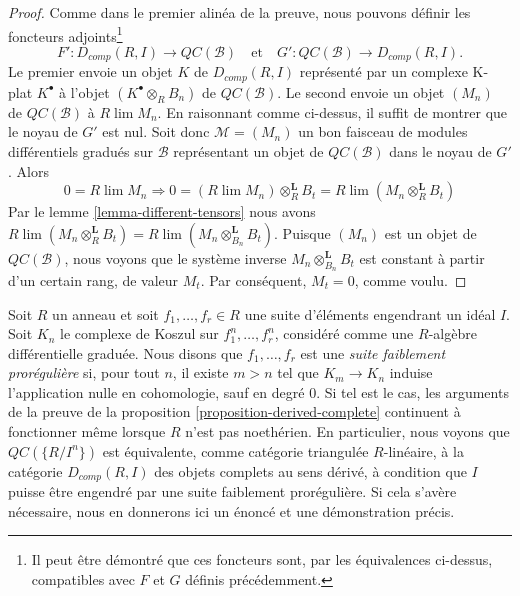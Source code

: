 \begin{proof}
\medskip\noindent
Comme dans le premier alinéa de la preuve, nous pouvons définir les foncteurs adjoints\footnote{Il peut être démontré que ces foncteurs sont, par les équivalences ci-dessus, compatibles avec $F$ et $G$ définis précédemment.}
$$
F' : D_{comp}(R, I) \longrightarrow \mathit{QC}(\mathcal{B})
\quad\text{et}\quad
G' : \mathit{QC}(\mathcal{B}) \longrightarrow D_{comp}(R, I).
$$
Le premier envoie un objet $K$ de $D_{comp}(R, I)$ représenté par un complexe K-plat $K^\bullet$ à l'objet $(K^\bullet \otimes_R B_n)$ de $\mathit{QC}(\mathcal{B})$.
Le second envoie un objet $(M_n)$ de $\mathit{QC}(\mathcal{B})$ à $R\lim M_n$.
En raisonnant comme ci-dessus, il suffit de montrer que le noyau de $G'$ est nul.
Soit donc $\mathcal{M} = (M_n)$ un bon faisceau de modules différentiels gradués sur $\mathcal{B}$ représentant un objet de $\mathit{QC}(\mathcal{B})$ dans le noyau de $G'$. Alors
$$
0 = R\lim M_n \Rightarrow
0 = (R\lim M_n) \otimes_R^\mathbf{L} B_t =
R\lim (M_n \otimes_R^\mathbf{L} B_t)
$$
Par le lemme \ref{lemma-different-tensors}  nous avons $R\lim (M_n \otimes_R^\mathbf{L} B_t) = R\lim (M_n \otimes_{B_n}^\mathbf{L} B_t)$.
Puisque $(M_n)$ est un objet de $\mathit{QC}(\mathcal{B})$, nous voyons que le système inverse $M_n \otimes_{B_n}^\mathbf{L} B_t$ est constant à partir d'un certain rang, de valeur $M_t$.
Par conséquent, $M_t = 0$, comme voulu.
\end{proof}

\begin{remark}
\label{remark-proregular}
Soit $R$ un anneau et soit $f_1, \ldots, f_r \in R$ une suite d'éléments engendrant un idéal $I$.
Soit $K_n$ le complexe de Koszul sur $f_1^n, \ldots, f_r^n$, considéré comme une $R$-algèbre différentielle graduée.
Nous disons que $f_1, \ldots, f_r$ est une {\it suite faiblement prorégulière} si, pour tout $n$, il existe $m > n$ tel que $K_m \to K_n$ induise l'application nulle en cohomologie, sauf en degré $0$.
Si tel est le cas, les arguments de la preuve de la proposition \ref{proposition-derived-complete}  continuent à fonctionner même lorsque $R$ n'est pas noethérien.
En particulier, nous voyons que $\mathit{QC}(\{R/I^n\})$ est équivalente, comme catégorie triangulée $R$-linéaire, à la catégorie $D_{comp}(R, I)$ des objets complets au sens dérivé, à condition que $I$ puisse être engendré par une suite faiblement prorégulière.
Si cela s'avère nécessaire, nous en donnerons ici un énoncé et une démonstration précis.
\end{remark}














